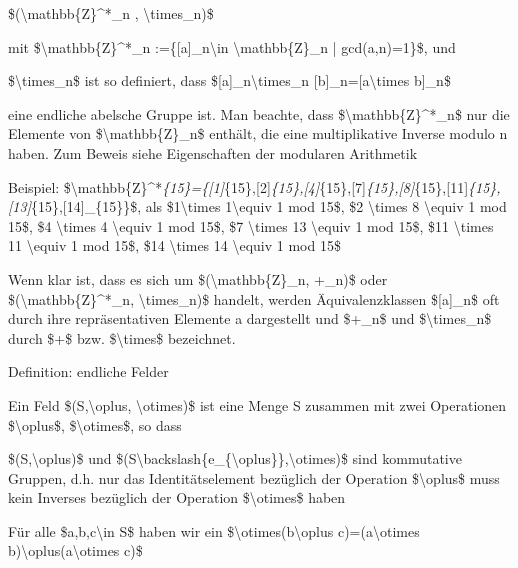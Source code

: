 \documentclass[a4paper]{article}
\begin{document}
\begin{multicols}{3}
\begin{itemize*}
\begin{itemize*}
                  \item \$(\textbackslash mathbb\{Z\}\^{}*\_n , \textbackslash times\_n)\$
                  \begin{itemize*} \item mit \$\textbackslash mathbb\{Z\}\^{}*\_n :=\{{[}a{]}\_n\textbackslash in \textbackslash mathbb\{Z\}\_n | gcd(a,n)=1\}\$, und \item \$\textbackslash times\_n\$ ist so definiert, dass \${[}a{]}\_n\textbackslash times\_n {[}b{]}\_n={[}a\textbackslash times b{]}\_n\$ \item eine endliche abelsche Gruppe ist. Man beachte, dass \$\textbackslash mathbb\{Z\}\^{}*\_n\$ nur die Elemente von \$\textbackslash mathbb\{Z\}\_n\$ enthält, die eine multiplikative Inverse modulo n haben. Zum Beweis siehe Eigenschaften der modularen Arithmetik \item Beispiel: \$\textbackslash mathbb\{Z\}\^{}*\emph{\{15\}=\{{[}1{]}}\{15\},{[}2{]}\emph{\{15\},{[}4{]}}\{15\},{[}7{]}\emph{\{15\},{[}8{]}}\{15\},{[}11{]}\emph{\{15\},{[}13{]}}\{15\},{[}14{]}\_\{15\}\}\$, als \$1\textbackslash times 1\textbackslash equiv 1 mod 15\$, \$2 \textbackslash times 8 \textbackslash equiv 1 mod 15\$, \$4 \textbackslash times 4 \textbackslash equiv 1 mod 15\$, \$7 \textbackslash times 13 \textbackslash equiv 1 mod 15\$, \$11 \textbackslash times 11 \textbackslash equiv 1 mod 15\$, \$14 \textbackslash times 14 \textbackslash equiv 1 mod 15\$ \end{itemize*}
            \end{itemize*}
            \item Wenn klar ist, dass es sich um \$(\textbackslash mathbb\{Z\}\_n,
            +\_n)\$ oder \$(\textbackslash mathbb\{Z\}\^{}*\_n,
            \textbackslash times\_n)\$ handelt, werden Äquivalenzklassen
            \${[}a{]}\_n\$ oft durch ihre repräsentativen Elemente a dargestellt
            und \$+\_n\$ und \$\textbackslash times\_n\$ durch \$+\$ bzw.
            \$\textbackslash times\$ bezeichnet.
            \begin{itemize*}
                  \item Definition: endliche Felder
                  \begin{itemize*} \item Ein Feld \$(S,\textbackslash oplus, \textbackslash otimes)\$ ist eine Menge S zusammen mit zwei Operationen \$\textbackslash oplus\$, \$\textbackslash otimes\$, so dass
                        \begin{itemize*} \item \$(S,\textbackslash oplus)\$ und \$(S\textbackslash backslash\{e\_\{\textbackslash oplus\}\},\textbackslash otimes)\$ sind kommutative Gruppen, d.h. nur das Identitätselement bezüglich der Operation \$\textbackslash oplus\$ muss kein Inverses bezüglich der Operation \$\textbackslash otimes\$ haben \item Für alle \$a,b,c\textbackslash in S\$ haben wir ein \$\textbackslash otimes(b\textbackslash oplus c)=(a\textbackslash otimes b)\textbackslash oplus(a\textbackslash otimes c)\$ \end{itemize*} \end{itemize*}

\end{itemize*}
\end{itemize*}
\end{multicols}
\end{document}
